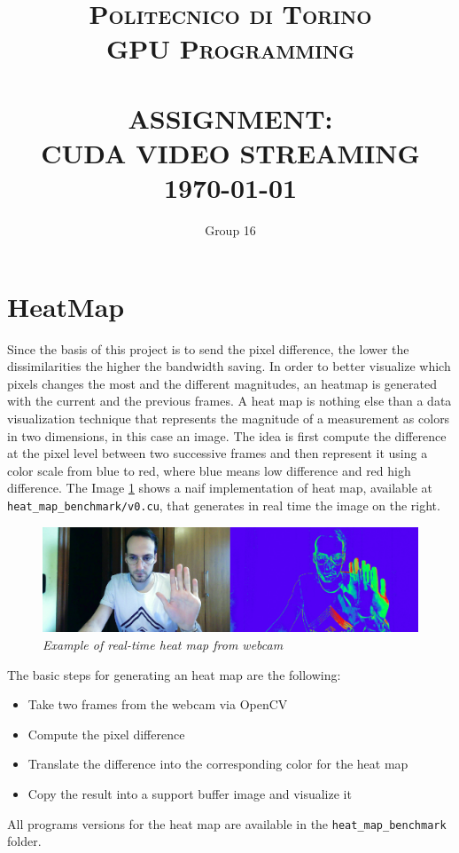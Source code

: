 \documentclass[paper=a4, fontsize=10pt]{scrartcl}	%
\title{	\normalsize \textsc{Politecnico di Torino\\GPU Programming} 	%
	\\[2.0cm]								%
	\HRule{0.5pt} \\						%
	\LARGE \textbf{\uppercase{Assignment:\\CUDA Video Streaming}}	%
	\HRule{2pt} \\ [0.5cm]		%
	\normalsize 
	\today %
}
\author{
	Group 16
}
\makeatletter
\def\printtitle{%
	{\centering \@title\par}}
\def\printauthor{%
	{\centering \large \@author}}
\makeatother
\begin{document}
	\thispagestyle{empty}		%
	
	\printtitle					%
	\vfill
	\printauthor				%
	\newpage
	\setcounter{page}{1}		%

	\section{HeatMap}
	Since the basis of this project is to send the pixel difference, the lower the dissimilarities the higher the bandwidth saving. In order to better visualize which pixels changes the most and the different magnitudes, an heatmap is generated with the current and the previous frames.\newline\newline	
	A heat map is nothing else than a data visualization technique that represents the magnitude of a measurement as colors in two dimensions, in this case an image. The idea is first compute the difference at the pixel level between two successive frames and then represent it using a color scale from blue to red, where blue means low difference and red high difference. The Image \ref{fig:heat_v0} shows a naif implementation of heat map, available at \texttt{heat\_map\_benchmark/v0.cu}, that generates in real time the image on the right.

	\begin{figure}[H]
		\centering
		\includegraphics[width=0.9\linewidth]{images/heatmap/v0}
		\caption{\textit{Example of real-time heat map from webcam}}
		\label{fig:heat_v0}
	\end{figure}
	The basic steps for generating an heat map are the following:
	\begin{itemize}
		\itemsep0sp
		\item Take two frames from the webcam via OpenCV
		\item Compute the pixel difference
		\item Translate the difference into the corresponding color for the heat map
		\item Copy the result into a support buffer image and visualize it
	\end{itemize}
	All programs versions for the heat map are available in the \texttt{heat\_map\_benchmark} folder.
	
\end{document}
